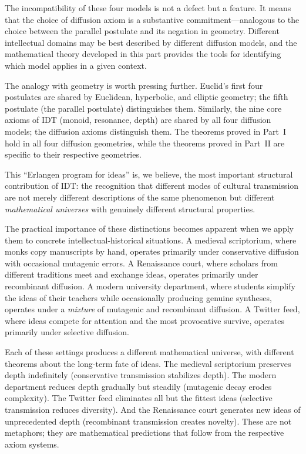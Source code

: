 \documentclass[11pt,openany]{book}
\theoremstyle{definition}
\theoremstyle{plain}
\theoremstyle{remark}
\begin{document}
The incompatibility of these four models is not a defect but a feature. It means that the choice of diffusion axiom is a substantive commitment---analogous to the choice between the parallel postulate and its negation in geometry. Different intellectual domains may be best described by different diffusion models, and the mathematical theory developed in this part provides the tools for identifying which model applies in a given context.

The analogy with geometry is worth pressing further. Euclid's first four postulates are shared by Euclidean, hyperbolic, and elliptic geometry; the fifth postulate (the parallel postulate) distinguishes them. Similarly, the nine core axioms of IDT (monoid, resonance, depth) are shared by all four diffusion models; the diffusion axioms distinguish them. The theorems proved in Part~I hold in all four diffusion geometries, while the theorems proved in Part~II are specific to their respective geometries.

This ``Erlangen program for ideas'' is, we believe, the most important structural contribution of IDT: the recognition that different modes of cultural transmission are not merely different descriptions of the same phenomenon but different \emph{mathematical universes} with genuinely different structural properties.

The practical importance of these distinctions becomes apparent when we apply them to concrete intellectual-historical situations. A medieval scriptorium, where monks copy manuscripts by hand, operates primarily under conservative diffusion with occasional mutagenic errors. A Renaissance court, where scholars from different traditions meet and exchange ideas, operates primarily under recombinant diffusion. A modern university department, where students simplify the ideas of their teachers while occasionally producing genuine syntheses, operates under a \emph{mixture} of mutagenic and recombinant diffusion. A Twitter feed, where ideas compete for attention and the most provocative survive, operates primarily under selective diffusion.

Each of these settings produces a different mathematical universe, with different theorems about the long-term fate of ideas. The medieval scriptorium preserves depth indefinitely (conservative transmission stabilizes depth). The modern department reduces depth gradually but steadily (mutagenic decay erodes complexity). The Twitter feed eliminates all but the fittest ideas (selective transmission reduces diversity). And the Renaissance court generates new ideas of unprecedented depth (recombinant transmission creates novelty). These are not metaphors; they are mathematical predictions that follow from the respective axiom systems.
\end{document}
